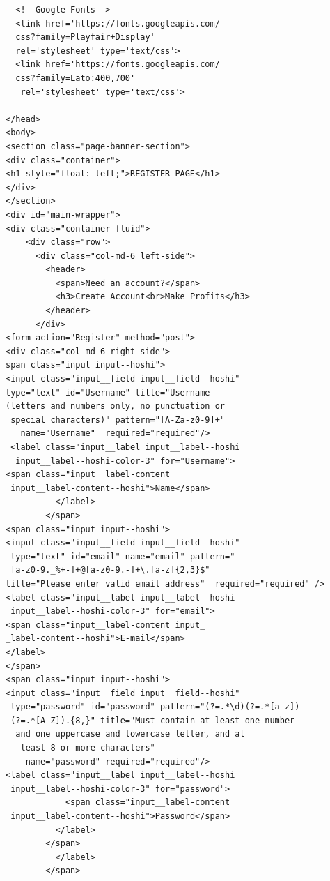 \documentclass[BTech]{srmuthesis}
\begin{document}
\begin{verbatim}
  <!--Google Fonts-->
  <link href='https://fonts.googleapis.com/
  css?family=Playfair+Display' 
  rel='stylesheet' type='text/css'>
  <link href='https://fonts.googleapis.com/
  css?family=Lato:400,700'
   rel='stylesheet' type='text/css'>

</head>
<body>
<section class="page-banner-section">
<div class="container">
<h1 style="float: left;">REGISTER PAGE</h1>
</div>
</section>
<div id="main-wrapper">
<div class="container-fluid">
    <div class="row">
      <div class="col-md-6 left-side">
        <header>
          <span>Need an account?</span>
          <h3>Create Account<br>Make Profits</h3>
        </header>
      </div>
<form action="Register" method="post">
<div class="col-md-6 right-side">
span class="input input--hoshi">
<input class="input__field input__field--hoshi" 
type="text" id="Username" title="Username 
(letters and numbers only, no punctuation or
 special characters)" pattern="[A-Za-z0-9]+" 
   name="Username"  required="required"/>
 <label class="input__label input__label--hoshi
  input__label--hoshi-color-3" for="Username">
<span class="input__label-content
 input__label-content--hoshi">Name</span>
          </label>
        </span>
<span class="input input--hoshi">
<input class="input__field input__field--hoshi"
 type="text" id="email" name="email" pattern="
 [a-z0-9._%+-]+@[a-z0-9.-]+\.[a-z]{2,3}$"
title="Please enter valid email address"  required="required" />
<label class="input__label input__label--hoshi
 input__label--hoshi-color-3" for="email">
<span class="input__label-content input_
_label-content--hoshi">E-mail</span>
</label>
</span>
<span class="input input--hoshi">
<input class="input__field input__field--hoshi"
 type="password" id="password" pattern="(?=.*\d)(?=.*[a-z])
 (?=.*[A-Z]).{8,}" title="Must contain at least one number
  and one uppercase and lowercase letter, and at
   least 8 or more characters" 
    name="password" required="required"/>
<label class="input__label input__label--hoshi
 input__label--hoshi-color-3" for="password">
            <span class="input__label-content
 input__label-content--hoshi">Password</span>
          </label>
        </span>
          </label>
        </span>
 

\end{verbatim}
\end{document}
